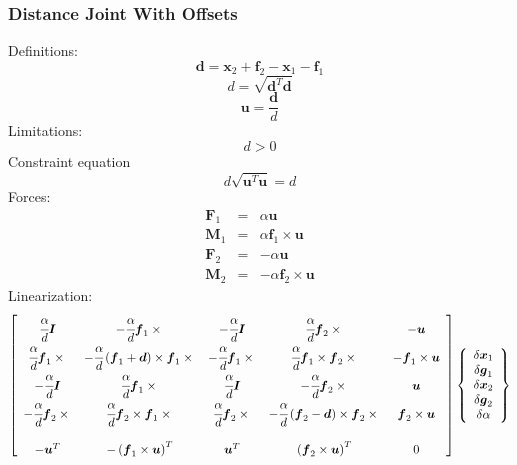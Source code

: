 \documentclass[10pt,dvips,fleqn]{report}
\newcommand{\T}[1]{\boldsymbol{#1}}
\begin{document}
\subsubsection{Distance Joint With Offsets}
Definitions:
\begin{equation}
	\T{d} = \T{x}_2 + \T{f}_2 - \T{x}_1 - \T{f}_1
\end{equation}
\begin{equation}
	d = \sqrt{\T{d}^T \T{d}}
\end{equation}
\begin{equation}
	\T{u} = \frac{\T{d}}{d}
\end{equation}
Limitations:
\begin{equation}
	d > 0
\end{equation}
Constraint equation 
\begin{equation}
	d \sqrt{\T{u}^T \T{u}} = d
\end{equation}
Forces:
\begin{eqnarray}
	\T{F}_1 & = & \alpha \T{u} \\
	\T{M}_1 & = & \alpha \T{f}_1 \times \T{u} \\
	\T{F}_2 & = & -\alpha \T{u} \\
	\T{M}_2 & = & -\alpha \T{f}_2 \times \T{u}
\end{eqnarray}
Linearization:
\begin{equation}
	\sqbr{\matr{ccccc}{
		\cfrac{\alpha}{d}\T{I} & -\cfrac{\alpha}{d}\T{f}_1\times{} &
			-\cfrac{\alpha}{d}\T{I} & \cfrac{\alpha}{d}\T{f}_2\times{} & -\T{u} \\
		\cfrac{\alpha}{d}\T{f}_1\times{} & 
			-\cfrac{\alpha}{d}\plbr{\T{f}_1 + \T{d}}\times\T{f}_1\times{} &
			-\cfrac{\alpha}{d}\T{f}_1\times{} & 
			\cfrac{\alpha}{d}\T{f}_1\times\T{f}_2\times{} & 
			-\T{f}_1\times\T{u} \\
		-\cfrac{\alpha}{d}\T{I} & \cfrac{\alpha}{d}\T{f}_1\times{} &
			\cfrac{\alpha}{d}\T{I} & -\cfrac{\alpha}{d}\T{f}_2\times{} & \T{u} \\
		-\cfrac{\alpha}{d}\T{f}_2\times{} &
			\cfrac{\alpha}{d}\T{f}_2\times\T{f}_1\times{} &
			\cfrac{\alpha}{d}\T{f}_2\times{} &
			- \cfrac{\alpha}{d}\plbr{\T{f}_2 - \T{d}}\times{\T{f}_2\times{}} &
			\T{f}_2\times\T{u} \\
		\\
		-\T{u}^T & - \plbr{\T{f}_1\times\T{u}}^T & 
			\T{u}^T & \plbr{\T{f}_2\times\T{u}}^T & 0
	}}\cubr{\cvvect{
		\delta\T{x}_1 \\
		\delta\T{g}_1 \\
		\delta\T{x}_2 \\
		\delta\T{g}_2 \\
		\delta\alpha
	}}
\end{equation}
\end{document}
